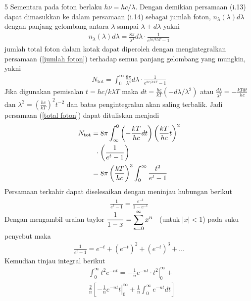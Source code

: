 \documentclass[a4paper  , 6 pt]{article}
\begin{document}
\begin{tiny}
\begin{multicols} {5}
Sementara pada foton berlaku $h\nu = h c /\lambda $. Dengan demikian persamaan (i.13) dapat dimasukkan ke dalam persamaan  (i.14)  sebagai jumlah foton, $n_\lambda (\lambda) d \lambda$ dengan panjang gelombang antara $\lambda$ sampai $\lambda + d \lambda $ yakni
\begin{align}
n_\lambda (\lambda) d \lambda = \frac{8 \pi}{\lambda^4} d \lambda \cdot \frac{1}{e^{hc/ k \lambda T} - 1} \label{jumlah foton}
\end{align}
jumlah total foton dalam kotak dapat diperoleh dengan mengintegralkan persamaan (\ref{jumlah foton}) terhadap semua panjang gelombang yang mungkin, yakni 
\begin{align}
N_\mathrm{tot} = \int_{0}^\infty \frac{8 \pi}{\lambda^4}d\lambda \cdot \frac{1}{e^{hc/k \lambda T} - 1}  \label{total foton}
\end{align}
Jika digunakan pemisalan  $\displaystyle t = hc/ k\lambda T$ maka $ \displaystyle dt = \frac{hc}{kT}(-d\lambda / \lambda^2)$ atau $\displaystyle \frac{d\lambda }{\lambda^2} = - \frac{ kT dt}{hc}$ dan $\displaystyle \lambda^2 = \left(\frac{hc}{kT}\right)^2 t^{-2}$ dan batas pengintegralan akan saling terbalik. Jadi persamaan (\ref{total foton}) dapat dituliskan menjadi
\begin{align}
N_\mathrm{tot} & = 8\pi \int_\infty^0 \left(- \frac{kT}{hc} dt \right) \left( \frac{kT }{hc} t\right)^2 \nonumber \\
& \hspace{0.2 cm } \cdot \left( \frac{1}{e^t - 1}\right) \nonumber \\
& = 8\pi \left(\frac{kT}{hc }\right)^3 \int_{0}^{\infty} \frac{t^2}{e^t -1} \label{n_tot}
\end{align}
Persamaan terkahir dapat diselesaikan dengan meninjau hubungan berikut
\begin{align}
\frac{1}{e^t - 1} = \frac{e^{-t}}{1- e^{-t}}  
\end{align}
Dengan mengambil uraian taylor $\displaystyle \frac{1}{1 - x} = \sum_{n=0}^\infty x^n \hspace{0.3 cm} $(untuk $ |x| < 1$) pada suku penyebut maka
\begin{align}
\frac{1}{e^t - 1} = e^{-t}+ (e^{-t} )^2 + (e^{-t})^3 + ...  \label{hasil uraian}
\end{align}
Kemudian tinjau integral berikut 
\begin{align}
& \int_0^\infty t^2 e^{-n t } =  
 \left. - \frac{1}{n} e^{-nt} \cdot t^2 \right \vert_0^\infty + \nonumber 
 \\
& \frac{2}{n}  \left [\left. -\frac{1}{n} e^{-n t} t \right \vert_0^\infty + \frac{1}{n} \int_{0}^{\infty}  e^{-nt} dt \right ]

\end{align}
\end{multicols}
\end{tiny}
\end{document}
